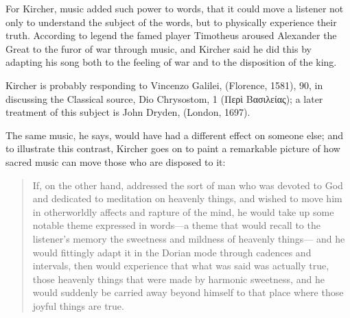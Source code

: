 For Kircher, music added such power to words, that it could move a listener not only to understand the subject of the words, but to physically experience their truth.
According to legend the famed  player Timotheus aroused Alexander the Great to the furor of war through music, and Kircher said he did this by adapting his song both to the feeling of war and to the disposition of the king.%
    \begin{Footnote}
        Kircher is probably responding to Vincenzo Galilei,  (Florence, 1581), 90, in discussing the Classical source, Dio Chrysostom,  1 (\textgreek{Περὶ Βασιλείας});  a later treatment of this subject is John Dryden,  (London, 1697).
    \end{Footnote}
The same music, he says, would have had a different effect on someone else; and to illustrate this contrast, Kircher goes on to paint a remarkable picture of how sacred music can move those who are disposed to it:
\begin{quote}
    If, on the other hand,  addressed the sort of man who was devoted to God and dedicated to meditation on heavenly things,
    and wished to move him in otherworldly affects and rapture of the mind,
    he would take up some notable theme expressed in words---a theme that would recall to the listener's memory the sweetness and mildness of heavenly things---
    and he would fittingly adapt it in the Dorian mode through cadences and intervals,
    then  would experience that what was said was actually true,
    those heavenly things that were made by harmonic sweetness,
    and he would suddenly be carried away beyond himself to that place where those joyful things are true.%
        \Autocite
        [bk.~7, 550:
        .]
        {Kircher:Musurgia}
\end{quote}

